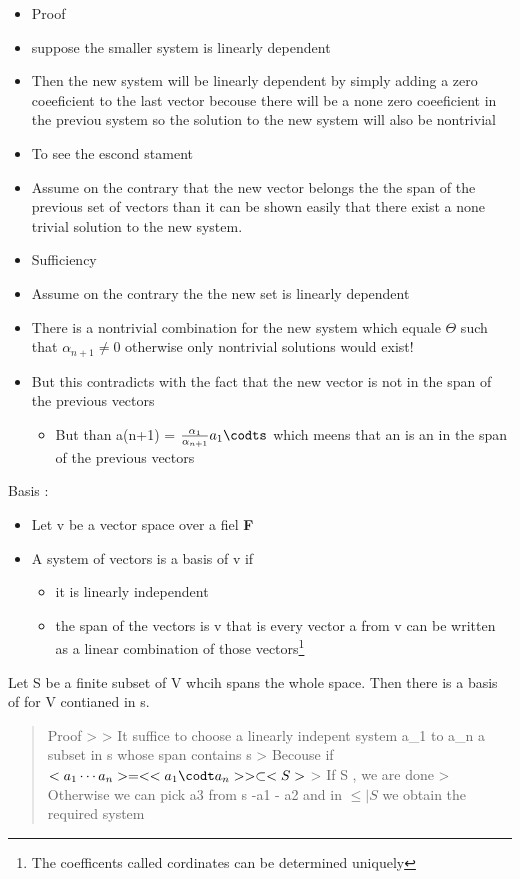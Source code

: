\documentclass{tufte-handout}
\providecommand{\tightlist}{%
  \setlength{\itemsep}{0pt}\setlength{\parskip}{0pt}}
\begin{document}
\begin{itemize}
  \begin{itemize}
  \tightlist
  \item
    Proof
  \item
    suppose the smaller system is linearly dependent
  \item
    Then the new system will be linearly dependent by simply adding a
    zero coeeficient to the last vector becouse there will be a none
    zero coeeficient in the previou system so the solution to the new
    system will also be nontrivial
  \item
    To see the escond stament
  \item
    Assume on the contrary that the new vector belongs the the span of
    the previous set of vectors than it can be shown easily that there
    exist a none trivial solution to the new system.
  \item
    Sufficiency
  \item
    Assume on the contrary the the new set is linearly dependent
  \item
    There is a nontrivial combination for the new system which equale
    \(\Theta\) such that \(\alpha_{n+1} \neq0\) otherwise only
    nontrivial solutions would exist!
  \item
    But this contradicts with the fact that the new vector is not in the
    span of the previous vectors

    \begin{itemize}
    \tightlist
    \item
      But than a(n+1) = \(\frac{\alpha_1}{\alpha_{n+1}}a_1 \codts\)
      which meens that an is an in the span of the previous vectors
    \end{itemize}
  \end{itemize}
\end{itemize}Basis :

\begin{itemize}
\tightlist
\item
  Let v be a vector space over a fiel \textbf{F}
\item
  A system of vectors is a basis of v if

  \begin{itemize}
  \tightlist
  \item
    it is linearly independent
  \item
    the span of the vectors is v that is every vector a from v can be
    written as a linear combination of those vectors\footnote{The
      coefficents called cordinates can be determined uniquely}
  \end{itemize}
\end{itemize}

Let S be a finite subset of V whcih spans the whole space. Then there is
a basis of for V contianed in s.

\begin{quote}
Proof \textgreater{} \textgreater{} It suffice to choose a linearly
indepent system a\_1 to a\_n a subset in s whose span contains s
\textgreater{} Becouse if
\(<a_1 \cdots a_n>=<<a_1 \codt a_n>> \subset <S>\) \textgreater{} If
\in S , we are done \textgreater{} Otherwise we can pick a3 from s -a1 -
a2 and in \(\leq |S\) we obtain the required system
\end{quote}
\end{document}
